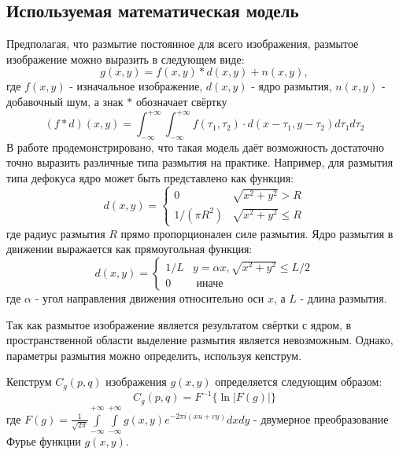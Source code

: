 \subsection{Используемая математическая модель }
Предполагая, что размытие постоянное для всего изображения, 
размытое изображение можно выразить в следующем виде:
\begin{equation}
g(x, y)=f(x, y) * d(x, y)+n(x, y),
\label{conv_formula}
\end{equation}
где $f(x,y)$ - изначальное изображение, $d(x, y)$ - ядро размытия, $n(x,y)$ - добавочный шум, а знак $*$ обозначает свёртку $$(f * d)(x, y)=\int_{-\infty}^{+\infty} \int_{-\infty}^{+\infty} f\left(\tau_{1}, \tau_{2}\right) \cdot d\left(x-\tau_{1}, y-\tau_{2}\right) d \tau_{1} d \tau_{2}$$
В работе \cite{kopeika} продемонстрировано, что такая модель даёт возможность достаточно точно выразить различные типа размытия на практике. 
Например, для размытия типа дефокуса ядро может быть представлено как функция:
\begin{equation}
d(x, y)=\left\{\begin{array}{ll}
0 & \sqrt{x^{2}+y^{2}}>R \\
1 /\left(\pi R^{2}\right) & \sqrt{x^{2}+y^{2}} \leq R
\end{array}\right.
\end{equation}
где радиус размытия $R$ прямо пропорционален силе размытия. 
Ядро размытия в движении выражается как прямоугольная функция:
\begin{equation}
d(x, y)=\left\{\begin{array}{ll}
 1/L & y = \alpha x, \sqrt{x^{2}+y^{2}} \leq L/2 \\
0 & \text { иначе}
\end{array}\right.
\end{equation}
где  $\alpha$  - угол направления движения относительно оси $x$, 
а $L$ - длина размытия.
\par
Так как размытое изображение является результатом свёртки с ядром, в пространственной области выделение размытия является невозможным. Однако, параметры размытия можно определить, используя кепструм.

Кепструм $C_{g}(p, q)$ изображения $g(x,y)$ определяется следующим образом:
\begin{equation}C_{g}(p, q)=F^{-1}\{\ln |F(g)|\}
\label{cepstrum_def}
\end{equation}
где  $F(g) = \frac{1}{\sqrt{2 \pi}} \int\limits_{-\infty}^{+\infty} \int\limits_{-\infty}^{+\infty} g(x, y) e^{-2 \pi i (x u+v y)} d x d y$  - двумерное преобразование Фурье функции $g(x,y)$.




